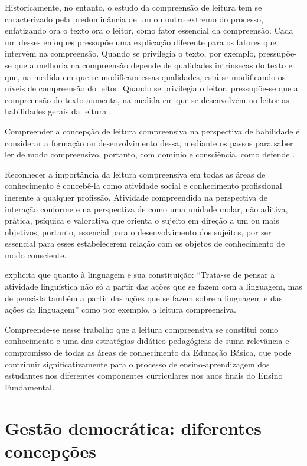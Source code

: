 \begin{refsection}
    Historicamente, no entanto, o estudo da compreensão de leitura tem se caracterizado pela predominância de um ou outro extremo do processo, enfatizando ora o texto ora o leitor, como fator essencial da compreensão. Cada um desses enfoques pressupõe uma explicação diferente para os fatores que intervêm na compreensão. Quando se privilegia o texto, por exemplo, pressupõe-se que a melhoria na compreensão depende de qualidades intrínsecas do texto e que, na medida em que se modificam essas qualidades, está se modificando os níveis de compreensão do leitor. Quando se privilegia o leitor, pressupõe-se que a compreensão do texto aumenta, na medida em que se desenvolvem no leitor as habilidades gerais da leitura \cite[p.~1--2]{Leffa1996Fatores}.

    Compreender a concepção de leitura compreensiva na perspectiva de habilidade é considerar a formação ou desenvolvimento dessa, mediante os passos para saber ler de modo compreensivo, portanto, com domínio e consciência, como defende \textcite{Talizina1988Formacion}.

    Reconhecer a importância da leitura compreensiva em todas as áreas de conhecimento é concebê-la como atividade social e conhecimento profissional inerente a qualquer profissão. Atividade compreendida na perspectiva de interação conforme \textcite{Vygotsky2005Pensamiento} e na perspectiva de \textcite{Leontiev2011Inport} como uma unidade molar, não aditiva, prática, psíquica e valorativa que orienta o sujeito em direção a um ou mais objetivos, portanto, essencial para o desenvolvimento dos sujeitos, por ser essencial para esses estabelecerem relação com os objetos de conhecimento de modo consciente.


    \textcite[p.~20]{Geraldi1991Psicopedagogia} explicita que quanto à linguagem e sua constituição: “Trata-se de pensar a atividade linguística não só a partir das ações que se fazem com a linguagem, mas de pensá-la também a partir das ações que se fazem sobre a linguagem e das ações da linguagem” como por exemplo, a leitura compreensiva.

    Compreende-se nesse trabalho que a leitura compreensiva se constitui como conhecimento e uma das estratégias didático-pedagógicas de suma relevância e compromisso de todas as áreas de conhecimento da Educação Básica, que pode contribuir significativamente para o processo de ensino-aprendizagem dos estudantes nos diferentes componentes curriculares nos anos finais do Ensino Fundamental.

    \section{Gestão democrática: diferentes concepções}


\end{refsection}
